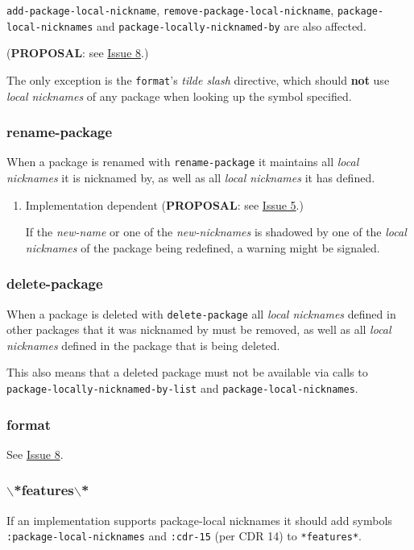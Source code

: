 \documentclass[11pt]{article}
\begin{document}
\texttt{add-package-local-nickname}, \texttt{remove-package-local-nickname},
\texttt{package-local-nicknames} and \texttt{package-locally-nicknamed-by} are also affected.

(\textbf{PROPOSAL}: see \hyperref[sec:orgcf85241]{Issue 8}.)

The only exception is the \texttt{format}'s \emph{tilde slash} directive, which should \textbf{not}
use \emph{local nicknames} of any package when looking up the symbol specified.
\subsubsection{rename-package}
\label{sec:org5c63493}
When a package is renamed with \texttt{rename-package} it maintains all \emph{local nicknames}
it is nicknamed by, as well as all \emph{local nicknames} it has defined.
\begin{enumerate}
\item Implementation dependent
\label{sec:org0d16b69}
(\textbf{PROPOSAL}: see \hyperref[sec:orge690307]{Issue 5}.)

If the \emph{new-name} or one of the \emph{new-nicknames} is shadowed by one of the \emph{local
nicknames} of the package being redefined, a warning might be signaled.
\end{enumerate}
\subsubsection{delete-package}
\label{sec:org9bf1926}
When a package is deleted with \texttt{delete-package} all \emph{local nicknames} defined in
other packages that it was nicknamed by must be removed, as well as all \emph{local
nicknames} defined in the package that is being deleted.

This also means that a deleted package must not be available via calls to
\texttt{package-locally-nicknamed-by-list} and \texttt{package-local-nicknames}.
\subsubsection{format}
\label{sec:org6df896e}
See \hyperref[sec:orgcf85241]{Issue 8}.
\subsubsection{$\backslash$*features$\backslash$*}
\label{sec:orgeee2458}
If an implementation supports package-local nicknames it should add symbols
\texttt{:package-local-nicknames} and \texttt{:cdr-15} (per CDR 14) to \texttt{*features*}.
\end{document}
